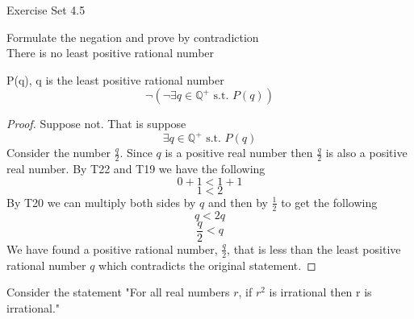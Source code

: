 \documentclass[12pt,letterpaper, onecolumn]{exam}
\begin{document}
	\centering\large Exercise Set 4.5
	\begin{questions}
		\setcounter{question}{6}\question Formulate the negation and prove by contradiction\\
		There is no least positive rational number 
		\begin{solution}
			P(q), q is the least positive rational number
			$$\neg(\neg\exists q\in\mathbb{Q^+} \textrm{ s.t. } P(q))$$
			\begin{proof}
				Suppose not. That is suppose
				$$\exists q \in \mathbb{Q^+} \textrm{ s.t. } P(q)$$
				Consider the number $\frac{q}{2}$. Since $q$ is a positive real number then $\frac{q}{2}$ is also a positive real number. By T22 and T19 we have the following
				$$0+1<1+1$$
				$$1<2$$
				By T20 we can multiply both sides by $q$ and then by $\frac{1}{2}$ to get the following
				$$q<2q$$
				$$\frac{q}{2}<q$$
				We have found a positive rational number, $\frac{q}{2}$, that is less than the least positive rational number $q$ which contradicts the original statement. 
			\end{proof}
		\end{solution}
		\setcounter{question}{21}\question Consider the statement "For all real numbers $r$, if $r^2$ is irrational then r is irrational."
			\begin{solution}
\end{solution}
\end{questions}
\end{document}
